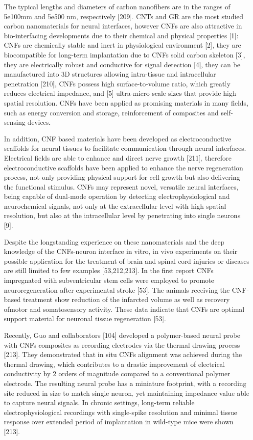The typical lengths and diameters of carbon nanofibers are in the ranges of 5e100mm and 5e500 nm, respectively [209]. CNTs and GR are the most studied carbon nanomaterials for neural interfaces, however CNFs are also attractive in bio-interfacing developments due to their chemical and physical properties [1]: CNFs are chemically stable and inert in physiological environment [2], they are biocompatible for long-term implantation due to CNFs solid carbon skeleton [3], they are electrically robust and conductive for signal detection [4], they can be manufactured into 3D structures allowing intra-tissue and intracellular penetration [210], CNFs possess high surface-to-volume ratio, which greatly reduces electrical impedance, and [5] ultra-micro scale sizes that provide high spatial resolution. CNFs have been applied as promising materials in many fields, such as energy conversion and storage, reinforcement of composites and self-sensing devices.

In addition, CNF based materials have been developed as electroconductive scaffolds for neural tissues to facilitate communication through neural interfaces. Electrical fields are able to enhance and direct nerve growth [211], therefore electroconductive scaffolds have been applied to enhance the nerve regeneration process, not only providing physical support for cell growth but also delivering the functional stimulus. CNFs may represent novel, versatile neural interfaces, being capable of dual-mode operation by detecting electrophysiological and neurochemical signals, not only at the extracellular level with high spatial resolution, but also at the intracellular level by penetrating into single neurons [9].

Despite the longstanding experience on these nanomaterials and the deep knowledge of the CNFs-neuron interface in vitro, in vivo experiments on their possible application for the treatment of brain and spinal cord injuries or diseases are still limited to few examples [53,212,213]. In the first report CNFs impregnated with subventricular stem cells were employed to promote neuroregeneration after experimental stroke [53]. The animals receiving the CNF-based treatment show reduction of the infarcted volume as well as recovery ofmotor and somatosensory activity. These data indicate that CNFs are optimal support material for neuronal tissue regeneration [53].

Recently, Guo and collaborators [104] developed a polymer-based neural probe with CNFs composites as recording electrodes via the thermal drawing process [213]. They demonstrated that in situ CNFs alignment was achieved during the thermal drawing, which contributes to a drastic improvement of electrical conductivity by 2 orders of magnitude compared to a conventional polymer electrode. The resulting neural probe has a miniature footprint, with a recording site reduced in size to match single neuron, yet maintaining impedance value able to capture neural signals. In chronic settings, long-term reliable electrophysiological recordings with single-spike resolution and minimal tissue response over extended period of implantation in wild-type mice were shown [213].

